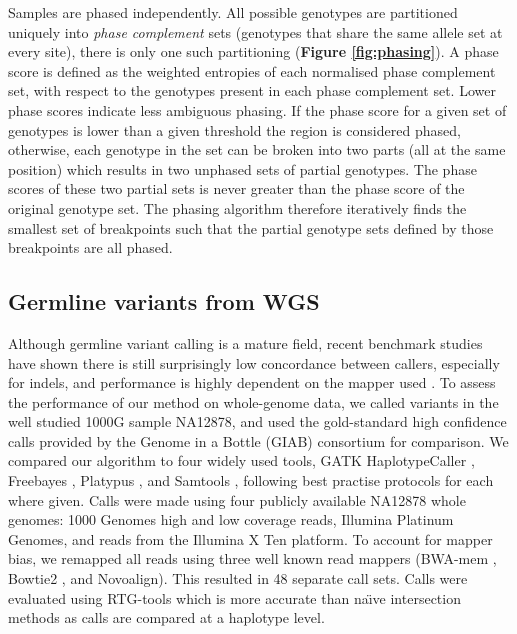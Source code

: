 \documentclass[notitlepage, twocolumn]{article}
\begin{document}
Samples are phased independently. All possible genotypes are partitioned uniquely into  \emph{phase complement} sets (genotypes that share the same allele set at every site), there is only one such partitioning (\textbf{Figure \ref{fig:phasing}}). A phase score is defined as the weighted entropies of each normalised phase complement set, with respect to the genotypes present in each phase complement set. Lower phase scores indicate less ambiguous phasing. If the phase score for a given set of genotypes is lower than a given threshold the region is considered phased, otherwise, each genotype in the set can be broken into two parts (all at the same position) which results in two unphased sets of partial genotypes. The phase scores of these two partial sets is never greater than the phase score of the original genotype set. The phasing algorithm therefore iteratively finds the smallest set of breakpoints such that the partial genotype sets defined by those breakpoints are all phased.

\subsection*{Germline variants from WGS}

Although germline variant calling is a mature field, recent benchmark studies have shown there is still surprisingly low concordance between callers, especially for indels, and performance is highly dependent on the mapper used \cite{RN162, RN163}. To assess the performance of our method on whole-genome data, we called variants in the well studied 1000G sample NA12878, and used the gold-standard high confidence calls provided by the Genome in a Bottle (GIAB) consortium \cite{RN153} for comparison. We compared our algorithm to four widely used tools, GATK HaplotypeCaller \cite{RN141}, Freebayes \cite{RN538}, Platypus \cite{RN5}, and Samtools \cite{RN537}, following best practise protocols for each where given. Calls were made using four publicly available NA12878 whole genomes: 1000 Genomes high and low coverage reads, Illumina Platinum Genomes, and reads from the Illumina X Ten platform. To account for mapper bias, we remapped all reads using three well known read mappers (BWA-mem \cite{RN539}, Bowtie2 \cite{RN164}, and Novoalign). This resulted in 48 separate call sets. Calls were evaluated using RTG-tools \cite{RN169} which is more accurate than na\"\i ve intersection methods as calls are compared at a haplotype level. 
\end{document}
